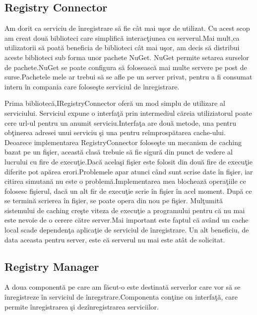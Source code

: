 \documentclass[a4paper,12pt]{report}
\begin{document}
\subsection{Registry Connector}

Am dorit ca serviciu de \^inregistrare s\u a fie c\^at mai u\c sor de utilizat.
Cu acest scop am creat dou\u a biblioteci care simplific\u a interac\c tiunea cu 
serverul.Mai mult,ca utilizatorii s\u a poat\u a beneficia de biblioteci c\^at mai 
u\c sor, am decis s\u a distribui aceste biblioteci sub forma unor pachete NuGet.
NuGet permite setarea surselor de pachete.NuGet se poate configura s\u a foloseasc\u a
mai multe servere pe post de surse.Pachetele mele ar trebui s\u a se afle pe un server 
privat, pentru a fi consumat intern \^in compania care folose\c ste serviciul de \^inregistrare.

Prima bibliotec\u a,IRegistryConnector ofer\u a un mod simplu de utilizare al serviciului.
Serviciul expune o interfa\c t\u a prin intermediul c\u areia utiliziatorul poate
cere url-ul pentru un anumit serviciu.Interfa\c ta are dou\u a metode, una pentru ob\c tinerea
adresei unui serviciu \c si una pentru re\^improsp\u atarea cache-ului.
Deoarece implementarea RegistryConnector folose\c ste un mecanism de caching bazat pe un fi\c sier,
aceast\u a clas\u a trebuie s\u a fie sigur\u a din punct de vedere al lucrului
cu fire de execu\c tie.Dac\u a acela\c si fi\c sier este folosit din dou\u a fire de execu\c tie 
diferite pot ap\u area erori.Problemele apar atunci c\^and sunt scrise date \^in fi\c sier,
iar citirea simutan\u a nu este o problem\u a.Implementarea mea blocheaz\u a opera\c tiile 
ce folosesc fi\c sierul, dac\u a un alt fir de execu\c tie scrie \^in fi\c sier \^in acel moment.
Dup\u a ce se termin\u a scrierea \^in fi\c sier, se poate opera din nou pe fi\c sier.
Mul\c tumit\u a sistemului de caching cre\c ste viteza de execu\c tie a programului pentru
c\u a nu mai este nevoie de o cerere c\u atre server.Mai important este faptul c\u a
av\^and un cache local scade dependen\c ta aplica\c tie de serviciul de \^inregistrare.
Un alt beneficiu, de data aceasta pentru server, este c\u a serverul nu mai este at\^at de 
solicitat.

\subsection{Registry Manager}

A doua component\u a pe care am f\u acut-o este destinat\u a serverlor care vor s\u a se 
\^inregistreze \^in serviciul de \^inregstrare.Componenta con\c tine on interfa\c t\u a,
care permite \^inregistrarea \c si dez\^inregistrarea serviciilor.
\end{document}
